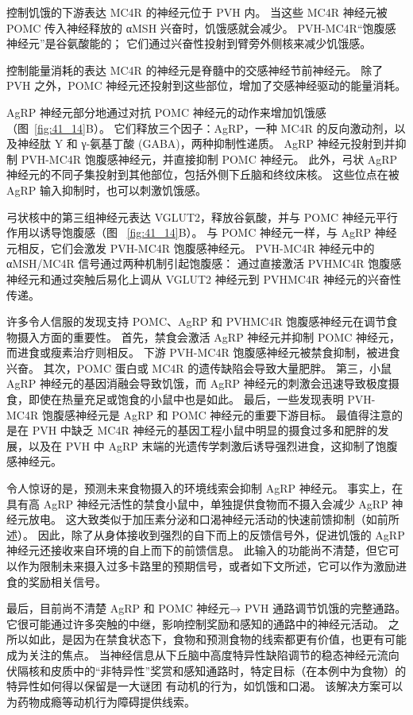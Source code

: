 控制饥饿的下游表达 MC4R 的神经元位于 PVH 内。 当这些 MC4R 神经元被 POMC 传入神经释放的 αMSH 兴奋时，饥饿感就会减少。
PVH-MC4R“饱腹感神经元”是谷氨酸能的；
它们通过兴奋性投射到臂旁外侧核来减少饥饿感。


控制能量消耗的表达 MC4R 的神经元是脊髓中的交感神经节前神经元。
除了 PVH 之外，POMC 神经元还投射到这些部位，增加了交感神经驱动的能量消耗。


AgRP 神经元部分地通过对抗 POMC 神经元的动作来增加饥饿感（图~\ref{fig:41_14}B）。
它们释放三个因子：AgRP，一种 MC4R 的反向激动剂，以及神经肽 Y 和 γ-氨基丁酸 (GABA)，两种抑制性递质。
AgRP 神经元投射到并抑制 PVH-MC4R 饱腹感神经元，并直接抑制 POMC 神经元。
此外，弓状 AgRP 神经元的不同子集投射到其他部位，包括外侧下丘脑和终纹床核。
这些位点在被 AgRP 输入抑制时，也可以刺激饥饿感。


弓状核中的第三组神经元表达 VGLUT2，释放谷氨酸，并与 POMC 神经元平行作用以诱导饱腹感（图 ~\ref{fig:41_14}B）。
与 POMC 神经元一样，与 AgRP 神经元相反，它们会激发 PVH-MC4R 饱腹感神经元。
PVH-MC4R 神经元中的 αMSH/MC4R 信号通过两种机制引起饱腹感：
通过直接激活 PVHMC4R 饱腹感神经元和通过突触后易化上调从 VGLUT2 神经元到 PVHMC4R 神经元的兴奋性传递。


许多令人信服的发现支持 POMC、AgRP 和 PVHMC4R 饱腹感神经元在调节食物摄入方面的重要性。
首先，禁食会激活 AgRP 神经元并抑制 POMC 神经元，而进食或瘦素治疗则相反。
下游 PVH-MC4R 饱腹感神经元被禁食抑制，被进食兴奋。
其次，POMC 蛋白或 MC4R 的遗传缺陷会导致大量肥胖。
第三，小鼠 AgRP 神经元的基因消融会导致饥饿，而 AgRP 神经元的刺激会迅速导致极度摄食，即使在热量充足或饱食的小鼠中也是如此。
最后，一些发现表明 PVH-MC4R 饱腹感神经元是 AgRP 和 POMC 神经元的重要下游目标。
最值得注意的是在 PVH 中缺乏 MC4R 神经元的基因工程小鼠中明显的摄食过多和肥胖的发展，以及在 PVH 中 AgRP 末端的光遗传学刺激后诱导强烈进食，这抑制了饱腹感神经元。


令人惊讶的是，预测未来食物摄入的环境线索会抑制 AgRP 神经元。
事实上，在具有高 AgRP 神经元活性的禁食小鼠中，单独提供食物而不摄入会减少 AgRP 神经元放电。
这大致类似于加压素分泌和口渴神经元活动的快速前馈抑制（如前所述）。
因此，除了从身体接收到强烈的自下而上的反馈信号外，促进饥饿的 AgRP 神经元还接收来自环境的自上而下的前馈信息。
此输入的功能尚不清楚，但它可以作为限制未来摄入过多卡路里的预期信号，或者如下文所述，它可以作为激励进食的奖励相关信号。


最后，目前尚不清楚 AgRP 和 POMC 神经元→ PVH 通路调节饥饿的完整通路。
它很可能通过许多突触的中继，影响控制奖励和感知的通路中的神经元活动。
之所以如此，是因为在禁食状态下，食物和预测食物的线索都更有价值，也更有可能成为关注的焦点。
当神经信息从下丘脑中高度特异性缺陷调节的稳态神经元流向伏隔核和皮质中的“非特异性”奖赏和感知通路时，特定目标（在本例中为食物）的特异性如何得以保留是一大谜团 有动机的行为，如饥饿和口渴。
该解决方案可以为药物成瘾等动机行为障碍提供线索。



